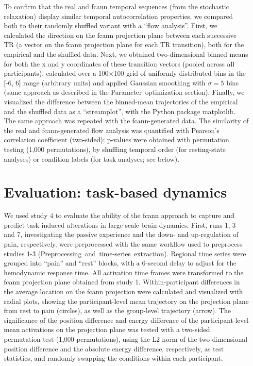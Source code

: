 \documentclass{article}
\begin{document}
To confirm that the real and \acrshort{fcann} temporal sequences (from the stochastic relaxation) display similar temporal autocorrelation properties, we compared both to their randomly shuffled variant with a ``flow analysis''.
First, we calculated the direction on the \acrshort{fcann} projection plane between each successive TR (a vector on the \acrshort{fcann} projection plane for each TR transition), both for the empirical and the shuffled data.
Next, we obtained two‑dimensional binned means for both the x and y coordinates of these transition vectors (pooled across all participants), calculated over a 100$\times$100 grid of uniformly distributed bins in the [-6, 6] range (arbitrary units) and applied Gaussian smoothing with $\sigma=5$ bins (same approach as described in the Parameter~optimization section).
Finally, we visualized the difference between the binned-mean trajectories of the empirical and the shuffled data as a ``streamplot'', with the Python package matplotlib.
The same approach was repeated with the \acrshort{fcann}-generated data. The similarity of the real and \acrshort{fcann}-generated flow analysis was quantified with Pearson's correlation coefficient (two-sided); p-values were obtained with permutation testing (1,000 permutations), by shuffling temporal order (for resting-state analyses) or condition labels (for task analyses; see below).

\section{Evaluation: task-based dynamics}

We used study 4 to evaluate the ability of the \acrshort{fcann} approach to capture and predict task-induced alterations in large-scale brain dynamics.
First, runs 1, 3 and 7, investigating the passive experience and the down- and up-regulation of pain, respectively, were preprocessed with the same workflow used to preprocess studies 1-3 (Preprocessing~and~time-series~extraction). Regional time series were grouped into ``pain'' and ``rest'' blocks, with a 6-second delay to adjust for the hemodynamic response time. All activation time frames were transformed to the \acrshort{fcann} projection plane obtained from study 1. Within-participant differences in the average location on the \acrshort{fcann} projection were calculated and visualized with radial plots, showing the participant-level mean trajectory on the projection plane from rest to pain (circles), as well as the group-level trajectory (arrow). The significance of the position difference and energy difference of the participant-level mean activations on the projection plane was tested with a two-sided permutation test (1,000 permutations), using the L2 norm of the two-dimensional position difference and the absolute energy difference, respectively, as test statistics, and randomly swapping the conditions within each participant.
\end{document}
